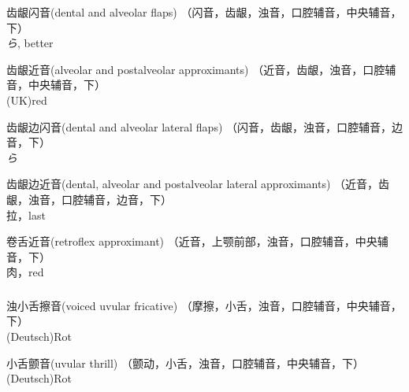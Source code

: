 \documentclass{ctexart}
\begin{document}
\newcommand{\entry}[5]{\par\noindent\textipa{/#1/} #2(#3) （#4）\\ #5}
\newcommand{\ra}{\textit{ら}}
\entry{R}{齿龈闪音}{dental and alveolar flaps}{闪音，齿龈，浊音，口腔辅音，中央辅音，下}{\ra, better}
\entry{\*r}{齿龈近音}{alveolar and postalveolar approximants}{近音，齿龈，浊音，口腔辅音，中央辅音，下}{(UK)red}
\entry{\textturnlonglegr}{齿龈边闪音}{dental and alveolar lateral flaps}{闪音，齿龈，浊音，口腔辅音，边音，下}{\ra}
\entry{l}{齿龈边近音}{dental, alveolar and postalveolar lateral approximants}{近音，齿龈，浊音，口腔辅音，边音，下}{拉，last}
\entry{\:R}{卷舌近音}{retroflex approximant}{近音，上颚前部，浊音，口腔辅音，中央辅音，下}{肉，red}
\subsubsection*{}
\entry{K}{浊小舌擦音}{voiced uvular fricative}{摩擦，小舌，浊音，口腔辅音，中央辅音，下}{(Deutsch)Rot}
\entry{\;R}{小舌颤音}{uvular thrill}{颤动，小舌，浊音，口腔辅音，中央辅音，下}{(Deutsch)Rot}
\end{document}
